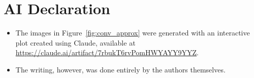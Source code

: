 \documentclass{article}
\newcommand{\russ}[1]{{\color{purple} (Russ: {#1})}}
\begin{document}





\newpage



\section*{AI Declaration}
\begin{itemize}
    \item The images in Figure~\ref{fig:conv_approx} were generated with an
    interactive plot created using Claude, available at \url{https://claude.ai/artifact/7rbukT6rvPomHWYAYY9YYZ}.
    \item The writing, however, was done entirely by the authors themselves.
\end{itemize}
\end{document}

